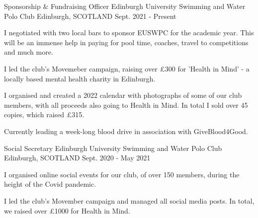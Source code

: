 

\begin{cventries}
  \cventry
    {Sponsorship \& Fundraising Officer} %
    {Edinburgh University Swimming and Water Polo Club} %
    {Edinburgh, SCOTLAND} %
    {Sept. 2021 - Present} %
    {
      \begin{cvitems} %
        \item I negotiated with two local bars to sponsor EUSWPC for the academic year. This will be an immense help in paying for pool time, coaches, travel to competitions and much more.
        \item I led the club's Movemeber campaign, raising over £300 for 'Health in Mind' - a locally based mental health charity in Edinburgh.
        \item I organised and created a 2022 calendar with photographs of some of our club members, with all proceeds also going to Health in Mind. In total I sold over 45 copies, which raised £315.
        \item Currently leading a week-long blood drive in association with GiveBlood4Good.
      \end{cvitems}
    }
    \vspace{.08cm}
    
  \cventry
    {Social Secretary} %
    {Edinburgh University Swimming and Water Polo Club} %
    {Edinburgh, SCOTLAND} %
    {Sept. 2020 - May 2021} %
    {
      \begin{cvitems} %
        \item I organised online social events for our club, of over 150 members, during the height of the Covid pandemic.
        \item I led the club's Movember campaign and managed all social media posts. In total, we raised over £1000 for Health in Mind.
      \end{cvitems}
    }
    \vspace{.08cm}
    

\end{cventries}
